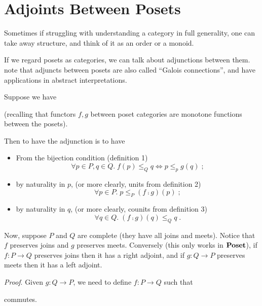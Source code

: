 \section{Adjoints Between Posets}
\begin{remark}
	Sometimes if struggling with understanding a category in full generality, one can take away structure, and think of it as an order or a monoid. 
\end{remark}
If we regard posets as categories, we can talk about adjunctions between them. note that adjuncts between posets are also called ``Galois connections'', and have applications in abstract interpretations.


Suppose we have
\begin{center}
\end{center}
(recalling that functors $f,g$ between poset categories are monotone functions
between the posets).

Then to have the adjunction is to have
\begin{itemize}
\item From the bijection condition (definition 1)
\[\forall p \in P, q \in Q.\; f(p) \le_Q q \iff p \le_p g(q)\;;\]
\item by naturality in $p$, (or more clearly, units from definition 2)
\[\forall p \in P.\; p \le_P (f \comp g)(p)\;;\]
\item by naturality in $q$, (or more clearly, counits from definition 3)
\[\forall q \in Q.\; (f \comp g)(q) \le_Q q\;.\]
\end{itemize}

Now, suppose $P$ and $Q$ are complete (\ie they have all joins and meets).
Notice that $f$ preserves joins and $g$ preserves meets. Conversely (this only
works in $\mathbf {Poset}$), if $f : P \longrightarrow Q$ preserves joins then it has
a right adjoint, and if $g : Q \longrightarrow P$ preserves meets then it has a
left adjoint.

\emph{Proof}. Given $g : Q \longrightarrow P$, we need to define $f : P
\longrightarrow Q$ such that
\begin{center}
\end{center}
commutes.

